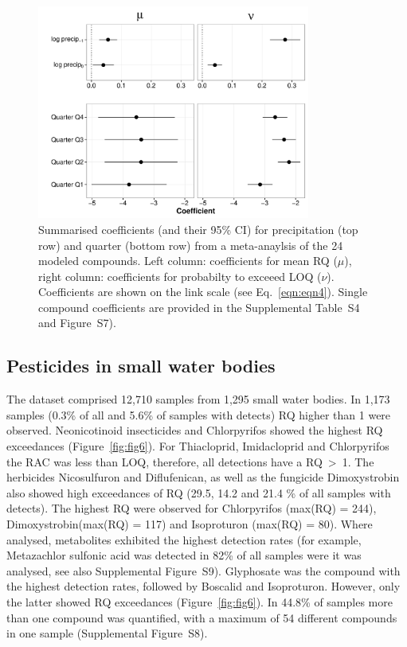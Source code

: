 \documentclass[journal=esthag,manuscript=article]{achemso}
\begin{document}
\begin{figure}[ht]
  \includegraphics[width=0.8\textwidth]{figure5.pdf}
  \caption{Summarised coefficients (and their 95\% CI) for precipitation (top row) and quarter (bottom row) from a meta-anaylsis of the 24 modeled compounds. Left column: coefficients for mean RQ ($\mu$), right column: coefficients for probabilty to exceeed LOQ ($\nu$). 
  Coefficients are shown on the link scale (see Eq.~\ref{eqn:eqn4}).
  Single compound coefficients are provided in the Supplemental Table~S4 and Figure~S7).
  }
  \label{fig:fig5}
\end{figure}



\subsection{Pesticides in small water bodies}

The dataset comprised 12,710 samples from 1,295 small water bodies.
In 1,173 samples (0.3\% of all and 5.6\% of samples with detects) RQ higher than 1 were observed.
Neonicotinoid insecticides and Chlorpyrifos showed the highest RQ exceedances (Figure~\ref{fig:fig6}).
For Thiacloprid, Imidacloprid and Chlorpyrifos the RAC was less than LOQ, therefore, all detections have a RQ~\textgreater~1. 
The herbicides Nicosulfuron and Diflufenican, as well as the fungicide Dimoxystrobin also showed high exceedances of RQ (29.5, 14.2 and 21.4 \% of all samples with detects).
The highest RQ were observed for Chlorpyrifos (max(RQ) = 244), Dimoxystrobin(max(RQ) = 117) and Isoproturon (max(RQ) = 80). 
Where analysed, metabolites exhibited the highest detection rates (for example, Metazachlor sulfonic acid was detected in 82\% of all samples were it was analysed, see also Supplemental Figure~S9).
Glyphosate was the compound with the highest detection rates, followed by Boscalid and Isoproturon. 
However, only the latter showed RQ exceedances (Figure~\ref{fig:fig6}).
In 44.8\% of samples more than one compound was quantified, with a maximum of 54 different compounds in one sample (Supplemental Figure~S8). 
\end{document}
